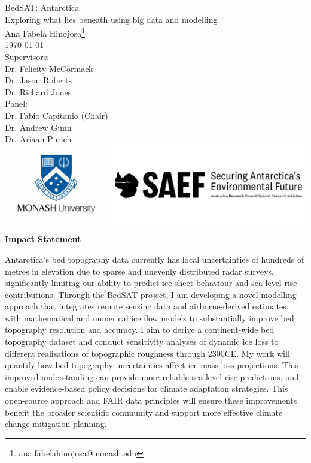 \documentclass[12pt, a4paper, openany]{book}
\newenvironment{impactstatement}
{\clearpage \thispagestyle{empty} \null \vfill \begin{center} \bfseries \large Impact Statement \end{center}}
{\vfill \null \clearpage}
\begin{document}
\begin{titlepage}
\begin{center}
    {\Huge BedSAT: Antarctica}\\ [1cm] 
    {\Large Exploring what lies beneath using big data and modelling}\\
    \vspace{5cm}
    {\large Ana Fabela Hinojosa\footnote{ana.fabelahinojosa@monash.edu}}\\
    \monthyeardate\today\\ [1cm]
    Supervisors:\\
    Dr. Felicity McCormack\\
    Dr. Jason Roberts\\
    Dr. Richard Jones\\ [2cm]
    Panel:\\
    Dr. Fabio Capitanio (Chair) \\
    Dr. Andrew Gunn \\
    Dr. Ariaan Purich \\ [3.5cm]
    \includegraphics[scale=0.2]{logos.png}

    \end{center}

\end{titlepage}

\begin{impactstatement}\label{impactstatement}
Antarctica's bed topography data currently has local uncertainties of hundreds of metres in elevation due to sparse and unevenly distributed radar surveys, significantly limiting our ability to predict ice sheet behaviour and sea level rise contributions. Through the BedSAT project, I am developing a novel modelling approach that integrates remote sensing data and airborne-derived estimates, with mathematical and numerical ice flow models to substantially improve bed topography resolution and accuracy. I aim to derive a continent-wide bed topography dataset and conduct sensitivity analyses of dynamic ice loss to different realisations of topographic roughness through 2300CE.
My work will quantify how bed topography uncertainties affect ice mass loss projections. This improved understanding can provide more reliable sea level rise predictions, and enable evidence-based policy decisions for climate adaptation strategies. This open-source approach and FAIR data principles will ensure these improvements benefit the broader scientific community and support more effective climate change mitigation planning.
\end{impactstatement}
\end{document}

